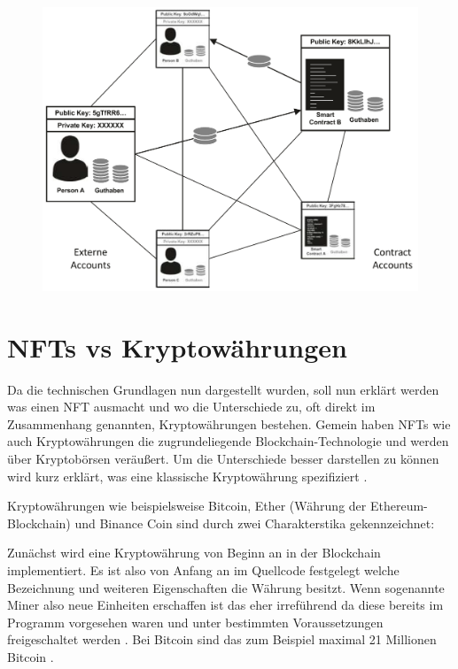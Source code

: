     \begin{figure}
        \includegraphics[width=12cm]{Bilder/Smart Contracts.PNG}
        \centering
        \label{smartcontract}
    \end{figure}

\section{NFTs vs Kryptowährungen}

Da die technischen Grundlagen nun dargestellt wurden, soll nun erklärt werden was einen \ac{NFT} ausmacht und wo die Unterschiede zu, oft direkt im Zusammenhang genannten, Kryptowährungen bestehen.
Gemein haben \acl{NFT}s wie auch Kryptowährungen die zugrundeliegende Blockchain-Technologie und werden über Kryptobörsen veräußert.
Um die Unterschiede besser darstellen zu können wird kurz erklärt, was eine klassische Kryptowährung spezifiziert \parencite[vgl.][13]{BenjaminKraudinger.2022}.

Kryptowährungen wie beispielsweise Bitcoin, Ether (Währung der Ethereum-Blockchain) und Binance Coin sind durch zwei Charakterstika gekennzeichnet:

Zunächst wird eine Kryptowährung von Beginn an in der Blockchain implementiert.
Es ist also von Anfang an im Quellcode festgelegt welche Bezeichnung und weiteren Eigenschaften die Währung besitzt. 
Wenn sogenannte \dq Miner\dq{} also neue Einheiten erschaffen ist das eher irreführend da diese bereits im Programm vorgesehen waren und unter bestimmten Voraussetzungen freigeschaltet werden \parencite[vgl.][801]{Gassebner.2018}.
Bei Bitcoin sind das zum Beispiel maximal 21 Millionen Bitcoin \parencite[vgl.][76]{Segendorf.2014}.

